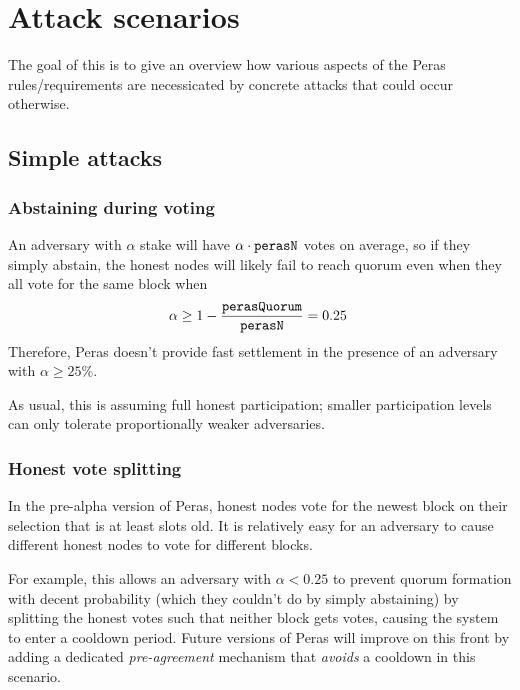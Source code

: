 \chapter{Attack scenarios}\label{chap:attack scenarios}

The goal of this  is to give an overview how various aspects of the Peras rules/requirements are necessicated by concrete attacks that could occur otherwise.

\section{Simple attacks}

\subsection{Abstaining during voting}\label{sec:abstaining during voting}

An adversary with $\alpha$ stake will have $\alpha\cdot\mathtt{perasN}$ votes on average, so if they simply abstain, the honest nodes will likely fail to reach quorum even when they all vote for the same block when \[ \alpha \ge 1-\frac{\mathtt{perasQuorum}}{\mathtt{perasN}} = 0.25 \; \]
Therefore, Peras doesn't provide fast settlement in the presence of an adversary with $\alpha\ge 25\%$.

As usual, this is assuming full honest participation; smaller participation levels can only tolerate proportionally weaker adversaries.

\subsection{Honest vote splitting}\label{sec:honest vote splitting}

In the pre-alpha version of Peras, honest nodes vote for the newest block on their selection that is at least \perasBlockMinSlots{} slots old.
It is relatively easy for an adversary to cause different honest nodes to vote for different blocks.

For example, this allows an adversary with $\alpha<0.25$ to prevent quorum formation with decent probability (which they couldn't do by simply abstaining) by splitting the honest votes such that neither block gets \perasQuorum{} votes, causing the system to enter a cooldown period.
Future versions of Peras will improve on this front by adding a dedicated \emph{pre-agreement} mechanism that \emph{avoids} a cooldown in this scenario.

